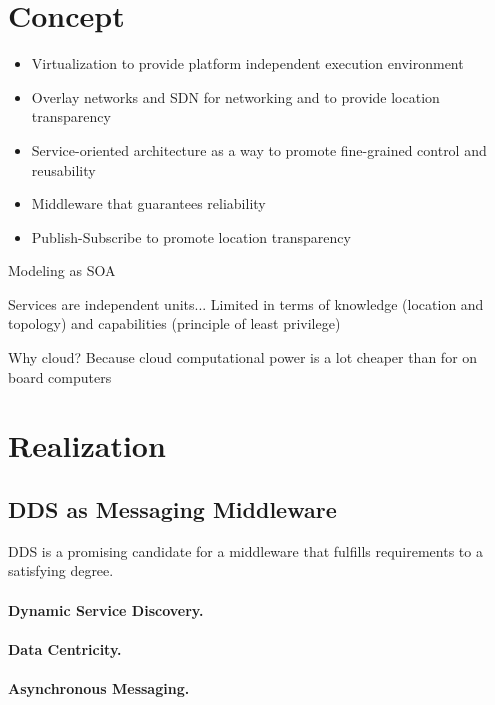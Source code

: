 \section{Concept}

\begin{itemize}
\item Virtualization to provide platform independent execution environment
\item Overlay networks and SDN for networking and to provide location transparency
\item Service-oriented architecture as a way to promote fine-grained control and reusability
\item Middleware that guarantees reliability
\item Publish-Subscribe to promote location transparency
\end{itemize}

Modeling as SOA 

Services are independent units... Limited in terms of knowledge (location and topology) and capabilities (principle of least privilege)


Why cloud? Because cloud computational power is a lot cheaper than for on board computers


\section{Realization}


\subsection{DDS as Messaging Middleware}

DDS is a promising candidate for a middleware that fulfills requirements to a satisfying degree.

\paragraph{Dynamic Service Discovery.}

\paragraph{Data Centricity.}

\paragraph{Asynchronous Messaging.}

